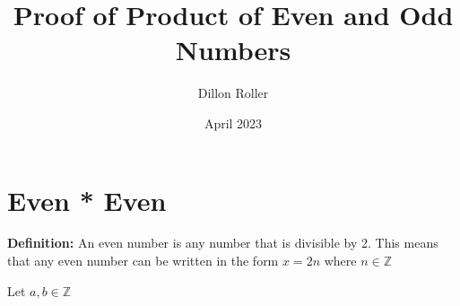 \documentclass{article}
\title{Proof of Product of Even and Odd Numbers}
\author{Dillon Roller}
\date{April 2023}
\begin{document}
\maketitle

\section{Even * Even}

\textbf{Definition:} An even number is any number that is divisible by 2. This means that any even number can be written in the form $x = 2n$ where $n \in \mathbb{Z}$

Let $a,b \in \mathbb{Z}$
\end{document}
